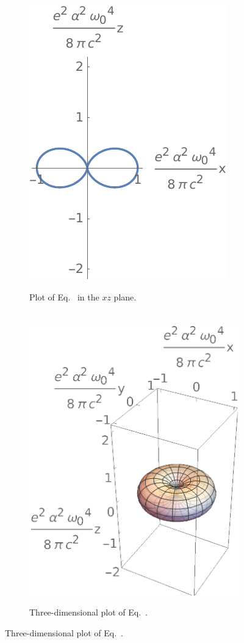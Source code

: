 {	\begin{figure}[b!]
		\begin{minipage}{0.475\textwidth}
			\begin{figure}[H] \flushright
				\includegraphics{3a} $\ $
				\caption{Plot of Eq.~ in the $xz$ plane.}
				\label{3a}
			\end{figure}
		\end{minipage}%
		\hspace{0.05\linewidth}%
		\begin{minipage}{0.475\textwidth}
			\begin{figure}[H] \flushleft
				$\quad$ \includegraphics{3a3d}
				\caption{Three-dimensional plot of Eq.~.}
				\label{3a3d}
			\end{figure}
		\end{minipage}
	\end{figure}
	
}
